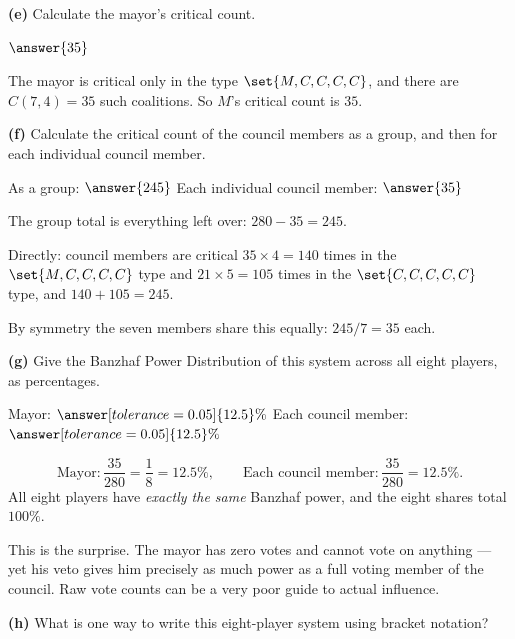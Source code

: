 \documentclass[12pt]{ximera}
\begin{document}
\begin{problem}
\begin{prompt}
\textbf{(e)} Calculate the mayor's critical count.

$\answer{35}$

\begin{feedback}
The mayor is critical only in the type $\set{M,C,C,C,C}$, and there are
$C(7,4)=35$ such coalitions. So $M$'s critical count is $35$.
\end{feedback}
\end{prompt}

\begin{prompt}
\textbf{(f)} Calculate the critical count of the council members as a group, and then
for each individual council member.

As a group: $\answer{245}$ \qquad Each individual council member: $\answer{35}$

\begin{feedback}
The group total is everything left over: $280 - 35 = 245$.

Directly: council members are critical $35\times 4 = 140$ times in the
$\set{M,C,C,C,C}$ type and $21\times 5 = 105$ times in the $\set{C,C,C,C,C}$ type, and
$140+105 = 245$. \checkmark

By symmetry the seven members share this equally: $245/7 = 35$ each.
\end{feedback}
\end{prompt}

\begin{prompt}
\textbf{(g)} Give the Banzhaf Power Distribution of this system across all eight
players, as percentages.

Mayor: $\answer[tolerance=0.05]{12.5}\%$ \qquad
Each council member: $\answer[tolerance=0.05]{12.5}\%$

\begin{feedback}
\[
\text{Mayor}: \frac{35}{280}=\frac18=12.5\%, \qquad
\text{Each council member}: \frac{35}{280}=12.5\%.
\]
All eight players have \emph{exactly the same} Banzhaf power, and the eight shares
total $100\%$. \checkmark

This is the surprise. The mayor has zero votes and cannot vote on anything --- yet his
veto gives him precisely as much power as a full voting member of the council. Raw
vote counts can be a very poor guide to actual influence.
\end{feedback}
\end{prompt}

\begin{prompt}
\textbf{(h)} What is one way to write this eight-player system using bracket notation?


\end{prompt}
\end{problem}
\end{document}
